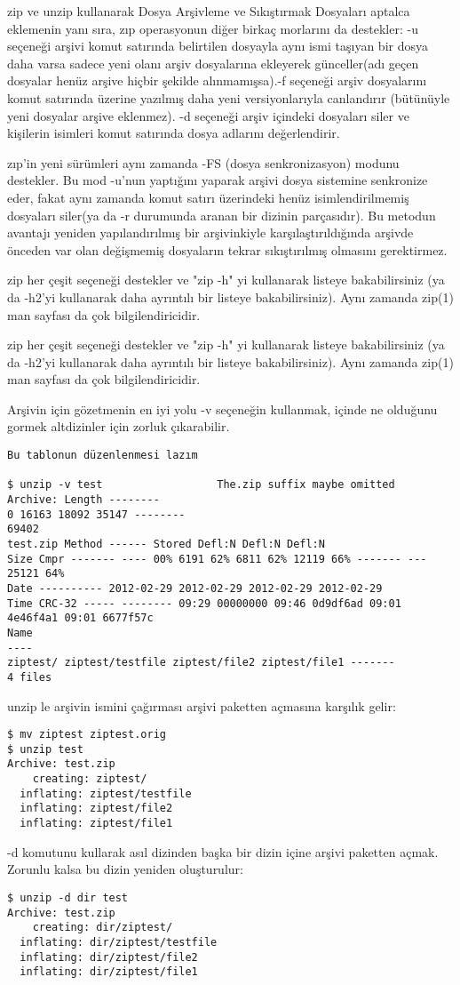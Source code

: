 \begin{section}{zip ve unzip kullanarak Dosya Arşivleme ve Sıkıştırmak}
Dosyaları aptalca eklemenin yanı sıra, zıp operasyonun diğer birkaç morlarını da destekler:  -u seçeneği arşivi komut satırında belirtilen dosyayla aynı ismi taşıyan bir dosya daha varsa sadece yeni olanı arşiv dosyalarına ekleyerek günceller(adı geçen dosyalar henüz arşive hiçbir şekilde alınmamışsa).-f seçeneği arşiv dosyalarını komut satırında üzerine yazılmış daha yeni versiyonlarıyla canlandırır (bütünüyle yeni dosyalar arşive eklenmez). -d seçeneği arşiv içindeki dosyaları siler ve kişilerin isimleri komut satırında dosya adlarını değerlendirir.

zıp'in yeni sürümleri aynı zamanda -FS (dosya senkronizasyon) modunu destekler. Bu mod -u'nun yaptığını yaparak arşivi dosya sistemine senkronize eder, fakat aynı zamanda komut satırı üzerindeki henüz isimlendirilmemiş dosyaları siler(ya da -r durumunda aranan bir dizinin parçasıdır). Bu metodun avantajı yeniden yapılandırılmış bir arşivinkiyle karşılaştırıldığında arşivde önceden var olan değişmemiş dosyaların tekrar sıkıştırılmış olmasını gerektirmez.

zip her çeşit seçeneği destekler ve "zip -h" yi kullanarak listeye bakabilirsiniz (ya da -h2'yi kullanarak daha ayrıntılı bir listeye bakabilirsiniz). Aynı zamanda zip(1) man sayfası da çok bilgilendiricidir.

zip her çeşit seçeneği destekler ve "zip -h" yi kullanarak listeye bakabilirsiniz (ya da -h2'yi kullanarak daha ayrıntılı bir listeye bakabilirsiniz). Aynı zamanda zip(1) man sayfası da çok bilgilendiricidir.

Arşivin için gözetmenin en iyi yolu -v seçeneğin kullanmak, içinde ne olduğunu gormek altdizinler için zorluk çıkarabilir.

\begin{verbatim}
Bu tablonun düzenlenmesi lazım

$ unzip -v test                  The.zip suffix maybe omitted
Archive: Length --------
0 16163 18092 35147 --------
69402
test.zip Method ------ Stored Defl:N Defl:N Defl:N
Size Cmpr ------- ---- 00% 6191 62% 6811 62% 12119 66% ------- ---
25121 64%
Date ---------- 2012-02-29 2012-02-29 2012-02-29 2012-02-29
Time CRC-32 ----- -------- 09:29 00000000 09:46 0d9df6ad 09:01 4e46f4a1 09:01 6677f57c
Name
----
ziptest/ ziptest/testfile ziptest/file2 ziptest/file1 -------
4 files
\end{verbatim}

unzip le arşivin ismini çağırması arşivi paketten açmasına karşılık gelir:
\begin{verbatim}
$ mv ziptest ziptest.orig 
$ unzip test
Archive: test.zip
    creating: ziptest/ 
  inflating: ziptest/testfile 
  inflating: ziptest/file2 
  inflating: ziptest/file1
\end{verbatim}
-d komutunu kullarak asıl dizinden başka bir dizin içine arşivi paketten açmak. Zorunlu kalsa bu dizin yeniden oluşturulur:
\begin{verbatim}
$ unzip -d dir test 
Archive: test.zip
    creating: dir/ziptest/ 
  inflating: dir/ziptest/testfile 
  inflating: dir/ziptest/file2 
  inflating: dir/ziptest/file1
\end{verbatim}


\end{section}

